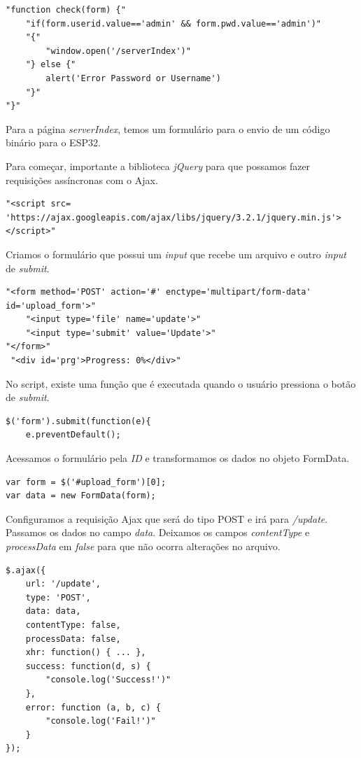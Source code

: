\documentclass[12pt]{article}
\begin{document}
\begin{lstlisting}
"function check(form) {"
    "if(form.userid.value=='admin' && form.pwd.value=='admin')"
    "{"
        "window.open('/serverIndex')"
    "} else {"
        alert('Error Password or Username')
    "}"
"}"
\end{lstlisting}

Para a página \textit{serverIndex}, temos um formulário para o envio de um código binário para o ESP32.

Para começar, importante a biblioteca \textit{jQuery} para que possamos fazer requisições assíncronas com o Ajax.

\begin{lstlisting}
"<script src=
'https://ajax.googleapis.com/ajax/libs/jquery/3.2.1/jquery.min.js'>
</script>"
\end{lstlisting}

Criamos o formulário que possui um \textit{input} que recebe um arquivo e outro \textit{input} de \textit{submit}.

\begin{lstlisting}
"<form method='POST' action='#' enctype='multipart/form-data' id='upload_form'>"
    "<input type='file' name='update'>"
    "<input type='submit' value='Update'>"
"</form>"
 "<div id='prg'>Progress: 0%</div>"
\end{lstlisting}

No script, existe uma função que é executada quando o usuário pressiona o botão de \textit{submit}. 

\begin{lstlisting}
$('form').submit(function(e){
    e.preventDefault();
\end{lstlisting}

Acessamos o formulário pela \textit{ID} e transformamos os dados no objeto FormData.

\begin{lstlisting}
var form = $('#upload_form')[0];
var data = new FormData(form);
\end{lstlisting}

Configuramos a requisição Ajax que será do tipo POST e irá para \textit{/update}. Passamos os dados no campo \textit{data}. Deixamos os campos \textit{contentType} e \textit{processData} em \textit{false} para que não ocorra alterações no arquivo.

\begin{lstlisting}
$.ajax({
    url: '/update',
    type: 'POST',
    data: data,
    contentType: false,
    processData: false,
    xhr: function() { ... },
    success: function(d, s) {
        "console.log('Success!')"
    },
    error: function (a, b, c) {
        "console.log('Fail!')"
    }
});
\end{lstlisting}
\end{document}
